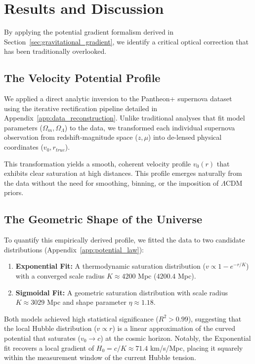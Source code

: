 \documentclass[11pt]{article}
\begin{document}
\section{Results and Discussion}
\label{sec:results_discussion}

By applying the potential gradient formalism derived in Section~\ref{sec:gravitational_gradient}, we identify a critical optical correction that has been traditionally overlooked.

\subsection{The Velocity Potential Profile}
We applied a direct analytic inversion to the Pantheon+ supernova dataset~\cite{PantheonPlus, SHOES2022} using the iterative rectification pipeline detailed in Appendix~\ref{app:data_reconstruction}. Unlike traditional analyses that fit model parameters ($\Omega_m, \Omega_\Lambda$) to the data, we transformed each individual supernova observation from redshift-magnitude space ($z, \mu$) into de-lensed physical coordinates ($v_0, r_{true}$).

This transformation yields a smooth, coherent velocity profile $v_0(r)$ that exhibits clear saturation at high distances. This profile emerges naturally from the data without the need for smoothing, binning, or the imposition of $\Lambda$CDM priors.

\subsection{The Geometric Shape of the Universe}
To quantify this empirically derived profile, we fitted the data to two candidate distributions (Appendix~\ref{app:potential_law}):
\begin{enumerate}
    \item \textbf{Exponential Fit:} A thermodynamic saturation distribution ($v \propto 1 - e^{-r/K}$) with a converged scale radius $K \approx 4200$ Mpc ($4200.4$ Mpc).
    \item \textbf{Sigmoidal Fit:} A geometric saturation distribution with scale radius $K \approx 3029$ Mpc and shape parameter $\eta \approx 1.18$.
\end{enumerate}

Both models achieved high statistical significance ($R^2 > 0.99$), suggesting that the local Hubble distribution ($v \propto r$) is a linear approximation of the curved potential that saturates ($v_0 \to c$) at the cosmic horizon. Notably, the Exponential fit recovers a local gradient of $H_0 = c/K \approx 71.4$ km/s/Mpc, placing it squarely within the measurement window of the current Hubble tension.
\end{document}

